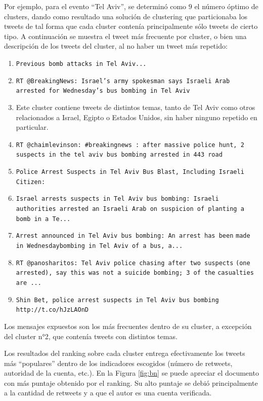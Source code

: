     Por ejemplo, para el evento ``Tel Aviv'', se determinó como $9$ el
    número óptimo de clusters, dando como resultado una solución de
    clustering que particionaba los tweets de tal forma que cada
    cluster contenía principalmente sólo tweets de cierto tipo. A continuación 
    se muestra el tweet más frecuente por cluster, o bien una descripción de los tweets
    del cluster, al no haber un tweet más repetido:

\begin{enumerate}
\item \texttt{Previous bomb attacks in Tel Aviv...}
\item \texttt{RT @BreakingNews: Israel's army spokesman says Israeli Arab        arrested for Wednesday's bus bombing in Tel Aviv}
\item Este cluster contiene tweets de distintos temas, tanto de Tel Aviv como
       otros relacionados a Israel, Egipto o Estados Unidos, sin haber ninguno repetido en particular.
\item \texttt{RT @chaimlevinson: \#breakingnews : after massive  police hunt,        2  suspects in the tel aviv bus bombing arrested in 443 road}
\item \texttt{Police Arrest Suspects in Tel Aviv Bus Blast, Including        Israeli Citizen:}
\item \texttt{Israel arrests suspects in Tel Aviv bus bombing: Israeli}
       \texttt{authorities arrested an Israeli Arab on suspicion of planting a}
       \texttt{bomb in a Te...}
\item \texttt{Arrest announced in Tel Aviv bus bombing: An arrest has been}
       \texttt{made in Wednesdaybombing in Tel Aviv of a bus, a...}
\item \texttt{RT @panosharitos: Tel Aviv police chasing after two suspects}
       \texttt{(one arrested), say this was not a suicide bombing; 3 of the}
       \texttt{casualties are ...}
\item \texttt{Shin Bet, police arrest suspects in Tel Aviv bus bombing}
       \texttt{http://t.co/hJzLAOnD}
\end{enumerate}
    Los mensajes expuestos son los más frecuentes dentro de su
    cluster, a excepción del cluster n°2, que contenía tweets con
    distintos temas.

    Los resultados del ranking sobre cada cluster entrega
    efectivamente los tweets más ``populares'' dentro de los indicadores
    escogidos (número de retweets, autoridad de la cuenta, etc.). En
    la Figura \ref{fig:bn} se puede apreciar el documento con más
    puntaje obtenido por el ranking. Su alto puntaje se debió
    principalmente a la cantidad de retweets y a que el autor es una
    cuenta verificada.

